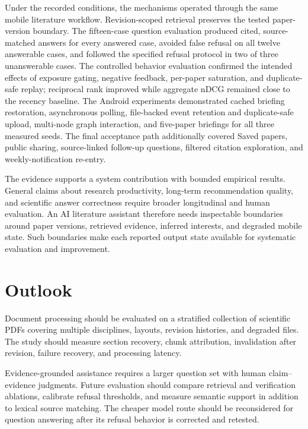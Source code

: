 Under the recorded conditions, the mechanisms operated through the same mobile literature workflow.
Revision-scoped retrieval preserves the tested paper-version boundary.
The fifteen-case question evaluation produced cited, source-matched answers for every answered case, avoided false refusal on all twelve answerable cases, and followed the specified refusal protocol in two of three unanswerable cases.
The controlled behavior evaluation confirmed the intended effects of exposure gating, negative feedback, per-paper saturation, and duplicate-safe replay; reciprocal rank improved while aggregate nDCG remained close to the recency baseline.
The Android experiments demonstrated cached briefing restoration, asynchronous
polling, file-backed event retention and duplicate-safe upload, multi-node graph
interaction, and five-paper briefings for all three measured seeds. The final
acceptance path additionally covered Saved papers, public sharing, source-linked
follow-up questions, filtered citation exploration, and weekly-notification
re-entry.

The evidence supports a system contribution with bounded empirical results.
General claims about research productivity, long-term recommendation quality, and scientific answer correctness require broader longitudinal and human evaluation.
An AI literature assistant therefore needs inspectable boundaries around paper versions, retrieved evidence, inferred interests, and degraded mobile state.
Such boundaries make each reported output state available for systematic evaluation and improvement.

\section{Outlook}

Document processing should be evaluated on a stratified collection of scientific PDFs covering multiple disciplines, layouts, revision histories, and degraded files.
The study should measure section recovery, chunk attribution, invalidation after revision, failure recovery, and processing latency.

Evidence-grounded assistance requires a larger question set with human claim--evidence judgments.
Future evaluation should compare retrieval and verification ablations, calibrate refusal thresholds, and measure semantic support in addition to lexical source matching.
The cheaper model route should be reconsidered for question answering after its refusal behavior is corrected and retested.

